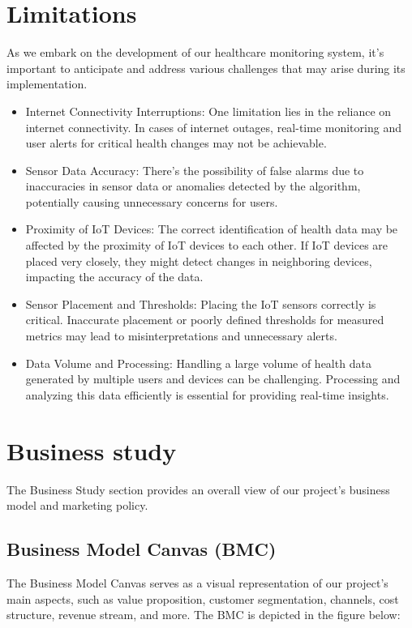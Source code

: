 \documentclass[12pt]{article}
\begin{document}
\section{Limitations}
As we embark on the development of our healthcare monitoring system, it's important to anticipate and address various challenges that may arise during its implementation.
\begin{itemize}
    \item Internet Connectivity Interruptions: One limitation lies in the reliance on internet connectivity. In cases of internet outages, real-time monitoring and user alerts for critical health changes may not be achievable.
    \item Sensor Data Accuracy: There's the possibility of false alarms due to inaccuracies in sensor data or anomalies detected by the algorithm, potentially causing unnecessary concerns for users.
    \item Proximity of IoT Devices: The correct identification of health data may be affected by the proximity of IoT devices to each other. If IoT devices are placed very closely, they might detect changes in neighboring devices, impacting the accuracy of the data.
    \item Sensor Placement and Thresholds: Placing the IoT sensors correctly is critical. Inaccurate placement or poorly defined thresholds for measured metrics may lead to misinterpretations and unnecessary alerts.
    \item Data Volume and Processing: Handling a large volume of health data generated by multiple users and devices can be challenging. Processing and analyzing this data efficiently is essential for providing real-time insights.
\end{itemize}
\section{Business study}
The Business Study section provides an overall view of our project's business model and marketing policy.

\subsection{Business Model Canvas (BMC)}
The Business Model Canvas serves as a visual representation of our project's main aspects, such as value proposition, customer segmentation, channels, cost structure, revenue stream, and more. The BMC is depicted in the figure below:
\end{document}
